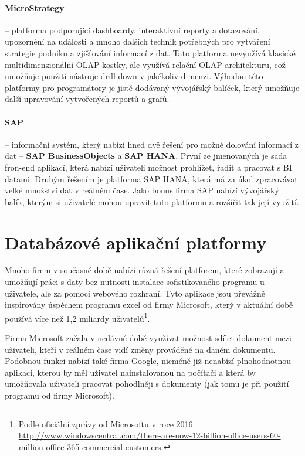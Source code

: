 \paragraph{MicroStrategy} -- platforma podporující dashboardy, interaktivní reporty a dotazování, upozornění na události a mnoho dalších technik potřebných pro vytváření strategie podniku a zjišťování informací z dat. Tato platforma nevyužívá klasické multidimenzionální OLAP kostky, ale využívá relační OLAP architekturu, což umožňuje použití nástroje drill down v jakékoliv dimenzi. Výhodou této platformy pro programátory je jistě dodávaný vývojářský balíček, který umožňuje další upravování vytvořených reportů a grafů. \cite{microstrategy}

\paragraph{SAP} -- informační systém, který nabízí hned dvě řešení pro možné dolování informací z dat -- \textbf{SAP BusinessObjects} a \textbf{SAP HANA}. První ze jmenovaných je sada fron-end aplikací, která nabízí uživateli možnost prohlížet, řadit a pracovat s BI datami. Druhým řešením je platforma SAP HANA, která má za úkol zpracovávat velké množství dat v reálném čase. Jako bonus firma SAP nabízí vývojářský balík, kterým si uživatelé mohou upravit tuto platformu a rozšířit tak její využití. \cite{sap}

\section{Databázové aplikační platformy}
\par Mnoho firem v současné době nabízí různá řešení platforem, které zobrazují a umožňují práci s daty bez nutnosti instalace sofistikovaného programu u uživatele, ale za pomoci webového rozhraní. Tyto aplikace jsou převážně inspirovány úspěchem programu excel od firmy Microsoft, který v aktuální době používá více než 1,2 miliardy uživatelů\footnote{Podle oficiální zprávy od Microsoftu v roce 2016 \url{http://www.windowscentral.com/there-are-now-12-billion-office-users-60-million-office-365-commercial-customers}.}.

\par Firma Microsoft začala v nedávné době využívat možnost sdílet dokument mezi uživateli, kteří v reálném čase vidí změny prováděné na daném dokumentu. Podobnou funkci nabízí také firma Google, nicméně již nenabízí plnohodnotnou aplikaci, kterou by měl uživatel nainstalovanou na počítači a která by umožňovala uživateli pracovat pohodlněji s dokumenty (jak tomu je při použití programu od firmy Microsoft).

